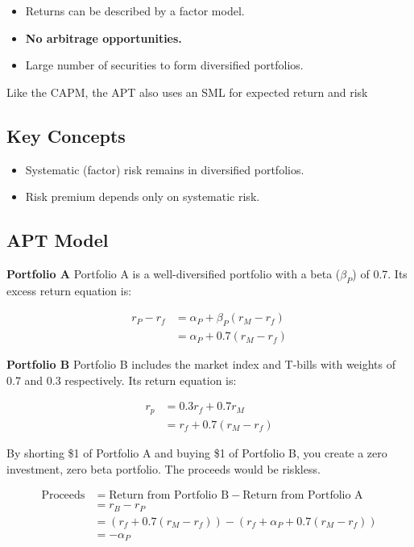 \documentclass[
]{book}
\providecommand{\tightlist}{%
  \setlength{\itemsep}{0pt}\setlength{\parskip}{0pt}}
\begin{document}
\begin{itemize}
\tightlist
\item
  Returns can be described by a factor model.
\item
  \textbf{No arbitrage opportunities.}
\item
  Large number of securities to form diversified portfolios.
\end{itemize}

Like the CAPM, the APT also uses an SML for expected return and risk

\hypertarget{key-concepts}{%
\subsection{Key Concepts}\label{key-concepts}}

\begin{itemize}
\tightlist
\item
  Systematic (factor) risk remains in diversified portfolios.
\item
  Risk premium depends only on systematic risk.
\end{itemize}

\hypertarget{apt-model}{%
\subsection{APT Model}\label{apt-model}}

\textbf{Portfolio A}
Portfolio A is a well-diversified portfolio with a beta (\(\beta_P\)) of 0.7. Its excess return equation is:

\[
\begin{align}
r_P - r_f &= \alpha_P + \beta_P (r_M - r_f) \\
          &= \alpha_P + 0.7(r_M - r_f)
\end{align}
\]

\textbf{Portfolio B}
Portfolio B includes the market index and T-bills with weights of 0.7 and 0.3 respectively. Its return equation is:

\[
\begin{align}
r_p &= 0.3r_f + 0.7r_M \\
    &= r_f + 0.7(r_M - r_f)
\end{align}
\]

By shorting \$1 of Portfolio A and buying \$1 of Portfolio B, you create a zero investment, zero beta portfolio. The proceeds would be riskless.

\[
\begin{align}
\text{Proceeds} &= \text{Return from Portfolio B} - \text{Return from Portfolio A} \\
                &= r_B - r_P \\
                &= \left( r_f + 0.7(r_M - r_f) \right) - \left( r_f + \alpha_P + 0.7(r_M - r_f) \right) \\
                &= -\alpha_P
\end{align}
\]
\end{document}
